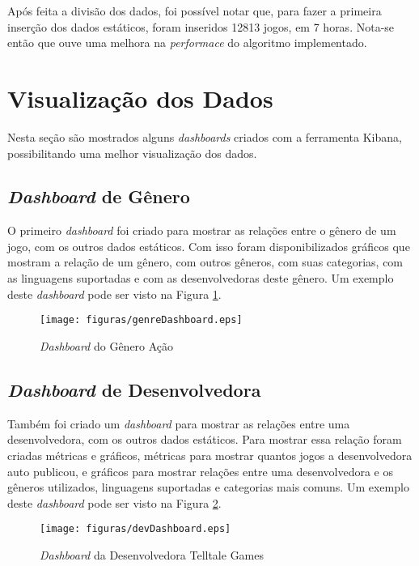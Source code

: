 Após feita a divisão dos dados, foi possível notar que, para fazer a primeira inserção dos dados estáticos, foram inseridos 12813 jogos, em 7 horas. Nota-se então que ouve uma melhora na \textit{performace} do algoritmo implementado.

\section{Visualização dos Dados}
Nesta seção são mostrados alguns \textit{dashboards} criados com a ferramenta Kibana, possibilitando uma melhor visualização dos dados.

\subsection*{\textit{Dashboard} de Gênero}
O primeiro \textit{dashboard} foi criado para mostrar as relações entre o gênero de um jogo, com os outros dados estáticos. Com isso foram disponibilizados gráficos que mostram a relação de um gênero, com outros gêneros, com suas categorias, com as linguagens suportadas e com as desenvolvedoras deste gênero. Um exemplo deste \textit{dashboard} pode ser visto na Figura \ref{image:genreDash}.
\begin{figure} [H]
\centering
\texttt{[image: figuras/genreDashboard.eps]}
\caption{\textit{Dashboard} do Gênero Ação}
\label{image:genreDash}
\end{figure}

\subsection*{\textit{Dashboard} de Desenvolvedora}
Também foi criado um \textit{dashboard} para mostrar as relações entre uma desenvolvedora, com os outros dados estáticos. Para mostrar essa relação foram criadas métricas e gráficos, métricas para mostrar quantos jogos a desenvolvedora auto publicou, e gráficos para mostrar relações entre uma desenvolvedora e os gêneros utilizados, linguagens suportadas e categorias mais comuns. Um exemplo deste \textit{dashboard} pode ser visto na Figura \ref{image:devDash}.
\begin{figure} [H]
\centering
\texttt{[image: figuras/devDashboard.eps]}
\caption{\textit{Dashboard} da Desenvolvedora Telltale Games}
\label{image:devDash}
\end{figure}
